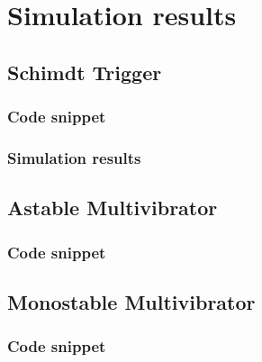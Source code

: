 \documentclass[12pt]{article}
\begin{document}
\section{Simulation results}

\subsection{Schimdt Trigger}
\subsubsection{Code snippet}

\subsubsection{Simulation results}

\subsection{Astable Multivibrator}
\subsubsection{Code snippet}

\subsection{Monostable Multivibrator}
\subsubsection{Code snippet}

\end{document}
